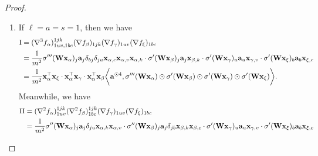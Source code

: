 \begin{proof}
\begin{enumerate}[itemsep=0mm]
\begin{align*}
			\RN{3} & = 
			\frac{1}{m^2}\rvx_\gamma^\top\rvx_\alpha \cdot\rvx_\gamma^\top\rvx_\xi \bigg\la\rva^{\odot 2} , \sigma'(\rmW \rvx_\alpha) \odot \sigma(\rmW \rvx_\beta) \odot \sigma''(\rmW \rvx_\gamma) \odot \sigma'(\rmW \rvx_\xi) \bigg\ra \\ 
			\RN{4} & = 
			\frac{1}{m^2}\rvx_\alpha^\top\rvx_\xi \cdot\rvx_\beta^\top\rvx_\gamma \bigg\la\rva^{\odot 2} , \sigma'(\rmW \rvx_\alpha) \odot \sigma'(\rmW \rvx_\beta) \odot \sigma'(\rmW \rvx_\gamma) \odot \sigma'(\rmW \rvx_\xi) \bigg\ra \\ 
			\RN{5} & = 
			\frac{1}{m^2}\rvx_\beta^\top\rvx_\gamma \cdot\rvx_\beta^\top\rvx_\xi \bigg\la\rva^{\odot 2} , \sigma(\rmW \rvx_\alpha) \odot \sigma''(\rmW \rvx_\beta) \odot \sigma'(\rmW \rvx_\gamma) \odot \sigma'(\rmW \rvx_\xi) \bigg\ra \\ 
			\RN{6} & = 
			\frac{1}{m^2}\rvx_\gamma^\top\rvx_\beta \cdot\rvx_\gamma^\top\rvx_\xi \bigg\la\rva^{\odot 2} , \sigma(\rmW \rvx_\alpha) \odot \sigma'(\rmW \rvx_\beta) \odot \sigma''(\rmW \rvx_\gamma) \odot \sigma'(\rmW \rvx_\xi) \bigg\ra.
		\end{align*}
		\endgroup
		\item If $\ell = a = s = 1$, then we have
		\begin{align*}
			\RN{1} & = (\nabla^3 f_\alpha)^{1jk}_{1uv, 1bc} (\nabla f_\beta)_{1jk} (\nabla f_\gamma)_{1uv} (\nabla f_\xi)_{1bc} \\
			& = \frac{1}{m^2} \sigma'''(\rmW \rvx_\alpha)_j \rva_j \delta_{bj} \delta_{ju}\rvx_{\alpha, c}\rvx_{\alpha, v}\rvx_{\alpha, k} \cdot \sigma'(\rmW \rvx_\beta)_j \rva_j\rvx_{\beta, k} \cdot \sigma'(\rmW \rvx_\gamma)_u \rva_u\rvx_{\gamma, v}  \cdot \sigma'(\rmW \rvx_\xi)_b \rva_b\rvx_{\xi, c} \\
			& = 
			\frac{1}{m^2}\rvx_\alpha^\top\rvx_\xi \cdot\rvx_\alpha^\top\rvx_\gamma \cdot\rvx_\alpha^\top\rvx_\beta \bigg\la\rva^{\odot 4} , \sigma'''(\rmW \rvx_\alpha) \odot \sigma'(\rmW \rvx_\beta) \odot \sigma'(\rmW \rvx_\gamma) \odot \sigma'(\rmW \rvx_\xi) \bigg\ra.
		\end{align*}
		Meanwhile, we have
		\begin{align*}
			\RN{2} & = (\nabla^2 f_\alpha)^{1jk}_{1uv}  (\nabla^2 f_{\beta})^{1jk}_{1bc} (\nabla f_\gamma)_{1uv} (\nabla f_\xi)_{1bc} \\
			& = \frac{1}{m^2} \sigma''(\rmW \rvx_\alpha)_j \rva_j \delta_{ju}\rvx_{\alpha, k}\rvx_{\alpha, v} \cdot \sigma''(\rmW \rvx_\beta)_j \rva_j \delta_{jb}\rvx_{\beta, k}\rvx_{\beta, c} \cdot \sigma'(\rmW \rvx_\gamma)_u \rva_u\rvx_{\gamma, v} \cdot \sigma'(\rmW \rvx_\xi)_b \rva_b\rvx_{\xi, c} \\

\end{align*}
\end{enumerate}
\end{proof}
